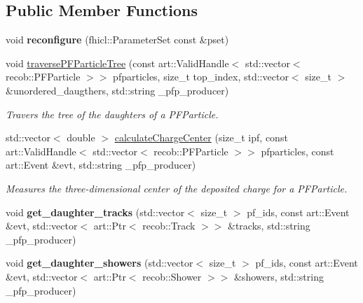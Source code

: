 \subsection*{Public Member Functions}
\begin{DoxyCompactItemize}
\item 
\hypertarget{group__lee_ga8d66370ea594fcdbe6aec9fae1fbf6ef}{void {\bfseries reconfigure} (fhicl\-::\-Parameter\-Set const \&pset)}\label{group__lee_ga8d66370ea594fcdbe6aec9fae1fbf6ef}

\item 
void \hyperlink{group__lee_ga5f3e6eecea4f75ea9eea31e520b4f0bc}{traverse\-P\-F\-Particle\-Tree} (const art\-::\-Valid\-Handle$<$ std\-::vector$<$ recob\-::\-P\-F\-Particle $>$$>$ pfparticles, size\-\_\-t top\-\_\-index, std\-::vector$<$ size\-\_\-t $>$ \&unordered\-\_\-daugthers, std\-::string \-\_\-pfp\-\_\-producer)
\begin{DoxyCompactList}\small\item\em Travers the tree of the daughters of a P\-F\-Particle. \end{DoxyCompactList}\item 
std\-::vector$<$ double $>$ \hyperlink{group__lee_ga367b3ad86924343d3ab54fa8c84091af}{calculate\-Charge\-Center} (size\-\_\-t ipf, const art\-::\-Valid\-Handle$<$ std\-::vector$<$ recob\-::\-P\-F\-Particle $>$$>$ pfparticles, const art\-::\-Event \&evt, std\-::string \-\_\-pfp\-\_\-producer)
\begin{DoxyCompactList}\small\item\em Measures the three-\/dimensional center of the deposited charge for a P\-F\-Particle. \end{DoxyCompactList}\item 
\hypertarget{group__lee_ga30273cdf4f136187b522c237e61b864e}{void {\bfseries get\-\_\-daughter\-\_\-tracks} (std\-::vector$<$ size\-\_\-t $>$ pf\-\_\-ids, const art\-::\-Event \&evt, std\-::vector$<$ art\-::\-Ptr$<$ recob\-::\-Track $>$$>$ \&tracks, std\-::string \-\_\-pfp\-\_\-producer)}\label{group__lee_ga30273cdf4f136187b522c237e61b864e}

\item 
\hypertarget{group__lee_ga2219037e4e0677d9aeb55e9615b19131}{void {\bfseries get\-\_\-daughter\-\_\-showers} (std\-::vector$<$ size\-\_\-t $>$ pf\-\_\-ids, const art\-::\-Event \&evt, std\-::vector$<$ art\-::\-Ptr$<$ recob\-::\-Shower $>$$>$ \&showers, std\-::string \-\_\-pfp\-\_\-producer)}\label{group__lee_ga2219037e4e0677d9aeb55e9615b19131}


\end{DoxyCompactItemize}
